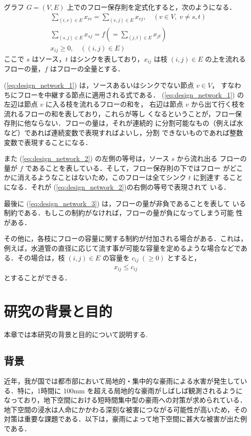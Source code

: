 \documentclass[a4paper,12pt,fleqn]{jarticle}
\begin{document}
グラフ $G = (V, E)$ 上でのフロー保存則を定式化すると，次のようになる．
%
\begin{align}
 & \sum_{(i, v) \in E} x_{iv}
 = \sum_{(v, j) \in E} x_{vj}, \quad (v \in V, \; v \not= s, t)
 \label{eq:design_network_1} \\
 & \sum_{(s, j) \in E} x_{sj}
 = f \left( = \sum_{(j, t) \in E} x_{jt} \right)
 \label{eq:design_network_2} \\
 & x_{ij} \ge 0, \quad ((i, j) \in E)
 \label{eq:design_network_3}
\end{align}
%
ここで $s$ はソース，$t$ はシンクを表しており，$x_{ij}$ は枝 $(i, j) \in
E$ の上を流れるフローの量，$f$ はフローの全量とする．

(\ref{eq:design_network_1}) は，ソースあるいはシンクでない節点 $v \in V$，
すなわちにフローを中継する節点に適用される式である．
%
(\ref{eq:design_network_1}) の左辺は節点 $v$ に入る枝を流れるフローの和を，
右辺は節点 $v$ から出て行く枝を流れるフローの和を表しており，これらが等し
くなるということが，フロー保存則に他ならない．フローの量は，それが連続的
に分割可能なもの（例えば水など）であれば連続変数で表現すればよいし，分割
できないものであれば整数変数で表現することになる．

また (\ref{eq:design_network_2}) の左側の等号は，ソース $s$ から流れ出る
フローの量が $f$ であることを表している．そして，フロー保存則の下ではフロー
がどこかに消えるようなことはないため，このフローは全てシンク $t$ に到達す
ることになる．それが (\ref{eq:design_network_2})の右側の等号で表現されて
いる．

最後に (\ref{eq:design_network_3}) は，フローの量が非負であることを表して
いる制約である．もしこの制約がなければ，フローの量が負になってしまう可能
性がある．

その他に，各枝にフローの容量に関する制約が付加される場合がある．これは，
例えば，水道管の直径に応じて流す事が可能な容量を定めるような場合などであ
る．その場合は，枝 $(i, j) \in E$ の容量を $c_{ij} \; (\ge 0)$ とすると，
%
\begin{align}
 x_{ij} \le c_{ij}
 \label{eq:design_network_4}
\end{align}
%
とすることができる．


\newpage
\section{研究の背景と目的}
本章では本研究の背景と目的について説明する.

\subsection{背景}
\label{subsec:background}
近年，我が国では都市部において局地的・集中的な豪雨による水害が発生している．特に，1時間に 100mm を超える局地的な豪雨がしばしば観測されるようになっており，地下空間における短時間集中型の豪雨への対策が求められている．地下空間の浸水は人命にかかわる深刻な被害につながる可能性が高いため，その対策は重要な課題である\cite{地下空間における浸水対策ガイドライン}．以下は，豪雨によって地下空間に甚大な被害が出た例である．
\end{document}
